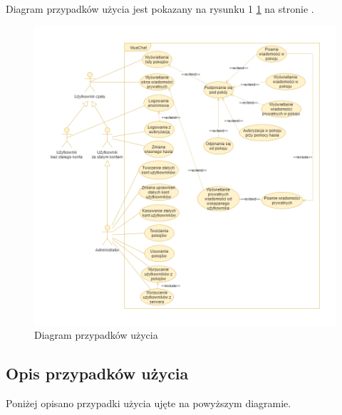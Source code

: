 \documentclass[11pt,oneside,a4paper,titlepage,onecolumn]{article}
\begin{document}
Diagram przypadków użycia jest pokazany na rysunku 1 \ref{diagram_przypadkow_uzycia}  na stronie \pageref{diagram_przypadkow_uzycia}.
\begin{figure}[!htp]
	\centering
	\includegraphics[width=\textwidth]{viuavm-dpu-v2}
	\caption{Diagram przypadków użycia}
	\label{diagram_przypadkow_uzycia}
\end{figure}

\newpage

\subsection{Opis przypadków użycia}

Poniżej opisano przypadki użycia ujęte na powyższym diagramie.
\end{document}
